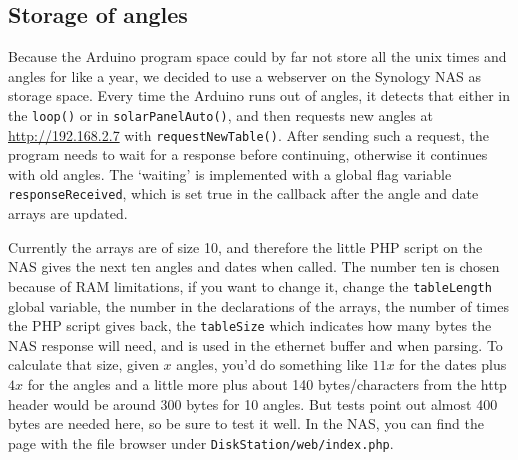 \subsection{Storage of angles}\label{subsec:storageOfAngles}
    Because the Arduino program space could by far not store all the unix times and angles for like a year, we decided to use a webserver on the Synology NAS as storage space.
    Every time the Arduino runs out of angles, it detects that either in the \verb|loop()| or in \verb|solarPanelAuto()|, and then requests new angles at \url{http://192.168.2.7} with \verb|requestNewTable()|. After sending such a request, the program needs to wait for a response before continuing, otherwise it continues with old angles.
    The `waiting' is implemented with a global flag variable \verb|responseReceived|, which is set true in the callback after the angle and date arrays are updated.

    Currently the arrays are of size 10, and therefore the little PHP script on the NAS gives the next ten angles and dates when called.
    The number ten is chosen because of RAM limitations, if you want to change it, change the \verb|tableLength| global variable, the number in the declarations of the arrays, the number of times the PHP script gives back, the \verb|tableSize| which indicates how many bytes the NAS response will need, and is used in the ethernet buffer and when parsing.
    To calculate that size, given $x$ angles, you'd do something like $11x$ for the dates plus $4x$ for the angles and a little more plus about 140 bytes/characters from the http header would be around 300 bytes for 10 angles.
    But tests point out almost 400 bytes are needed here, so be sure to test it well.
    In the NAS, you can find the page with the file browser under \verb|DiskStation/web/index.php|.


